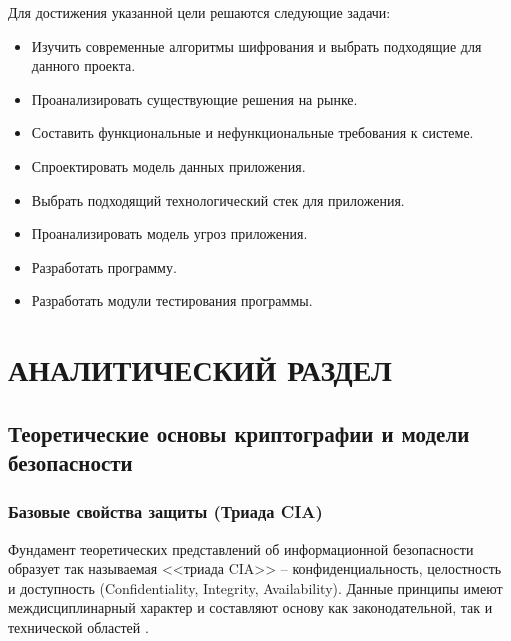 \documentclass[14pt, a4paper]{extarticle}
\begin{document}
	Для достижения указанной цели решаются следующие задачи:
	
	\begin{itemize}
		\item Изучить современные алгоритмы шифрования и выбрать подходящие для данного проекта.
		\item Проанализировать существующие решения на рынке.
		\item Составить функциональные и нефункциональные требования к системе.
		\item Спроектировать модель данных приложения.
		\item Выбрать подходящий технологический стек для приложения.
		\item Проанализировать модель угроз приложения.
		\item Разработать программу.
		\item Разработать модули тестирования программы.
	\end{itemize}
	
	\newpage
	
	\section[Аналитический раздел]{АНАЛИТИЧЕСКИЙ РАЗДЕЛ}
	
	\subsection{Теоретические основы криптографии и модели безопасности}
	\subsubsection{Базовые свойства защиты (Триада CIA)}
	
	Фундамент теоретических представлений об информационной безопасности образует так называемая <<триада CIA>> -- конфиденциальность, целостность и доступность (Confidentiality, Integrity, Availability). Данные принципы имеют междисциплинарный характер и составляют основу как законодательной, так и технической областей \cite{milnichuk}.
	
\end{document}

